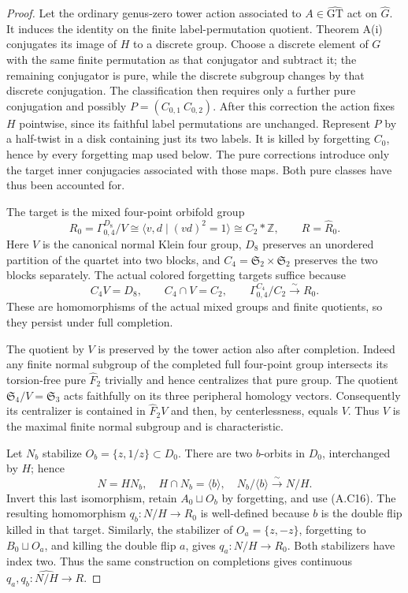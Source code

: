 \begin{proof}
Let the ordinary genus-zero tower action associated to
$A\in\widehat{\mathrm{GT}}$ act on $\widehat G$.  It induces
the identity on the finite label-permutation quotient.
Theorem A(i) conjugates its image of $H$ to a discrete group.
Choose a discrete element of $G$ with the same finite
permutation as that conjugator and subtract it; the remaining
conjugator is pure, while the discrete subgroup changes by
that discrete conjugation.  The classification then requires
only a further pure conjugation and possibly
$P=(C_{0,1}\ C_{0,2})$.  After this correction the action
fixes $H$ pointwise, since its faithful label permutations
are unchanged.  Represent $P$ by a half-twist in a disk
containing just its two labels.  It is killed by forgetting
$C_0$, hence by every forgetting map used below.  The pure
corrections introduce only the target inner conjugacies
associated with those maps.  Both pure classes have thus been
accounted for.

The target is the mixed four-point orbifold group
\[
 R_0=\Gamma_{0,4}^{D_8}/V
       \cong\langle v,d\mid(vd)^2=1\rangle\cong C_2*\mathbb Z,
 \qquad R=\widehat R_0.                                  \tag{A.C15}
\]
Here $V$ is the canonical normal Klein four group, $D_8$
preserves an unordered partition of the quartet into two
blocks, and $C_4=\mathfrak S_2\times\mathfrak S_2$
preserves the two blocks separately.  The actual colored
forgetting targets suffice because
\[
 C_4V=D_8,\qquad C_4\cap V=C_2,
 \qquad \Gamma_{0,4}^{C_4}/C_2\xrightarrow{\sim}R_0.      \tag{A.C16}
\]
These are homomorphisms of the actual mixed groups and finite
quotients, so they persist under full completion.

The quotient by $V$ is preserved by the tower action also
after completion.  Indeed any finite normal subgroup of the
completed full four-point group intersects its torsion-free
pure $\widehat F_2$ trivially and hence centralizes that pure
group.  The quotient $\mathfrak S_4/V=\mathfrak S_3$ acts
faithfully on its three peripheral homology vectors.
Consequently its centralizer is contained in
$\widehat F_2V$ and then, by centerlessness, equals $V$.
Thus $V$ is the maximal finite normal subgroup and is
characteristic.

Let $N_b$ stabilize $O_b=\{z,1/z\}\subset D_0$.
There are two $b$-orbits in $D_0$, interchanged by $H$;
hence
\[
 N=HN_b,\quad H\cap N_b=\langle b\rangle,
 \quad N_b/\langle b\rangle\xrightarrow{\sim}N/H.         \tag{A.C17}
\]
Invert this last isomorphism, retain $A_0\sqcup O_b$ by
forgetting, and use (A.C16).  The resulting homomorphism
$q_b:N/H\to R_0$ is well-defined because $b$ is the double
flip killed in that target.  Similarly, the stabilizer of
$O_a=\{z,-z\}$, forgetting to $B_0\sqcup O_a$, and killing
the double flip $a$, gives $q_a:N/H\to R_0$.
Both stabilizers have index two.  Thus the same construction
on completions gives continuous $q_a,q_b:\widehat{N/H}\to R$.


\end{proof}
